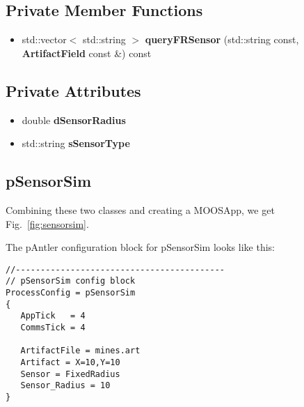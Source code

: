 \subsection*{Private Member Functions}
\begin{itemize}
\item std::vector$<$ std::string $>$ {\bf query\-FRSensor} (std::string const, {\bf Artifact\-Field} const \&) const
\end{itemize}
\subsection*{Private Attributes}
\begin{itemize}
\item double {\bf d\-Sensor\-Radius}
\item std::string {\bf s\-Sensor\-Type}
\end{itemize}

\subsection{pSensorSim}
Combining these two classes and creating a MOOSApp, we get Fig.~\ref{fig:sensorsim}.


The pAntler configuration block for pSensorSim looks like this:
\scriptsize
\begin{verbatim}
//------------------------------------------
// pSensorSim config block
ProcessConfig = pSensorSim
{
   AppTick   = 4
   CommsTick = 4
   
   ArtifactFile = mines.art
   Artifact = X=10,Y=10
   Sensor = FixedRadius
   Sensor_Radius = 10   
}
\end{verbatim}
\normalsize

